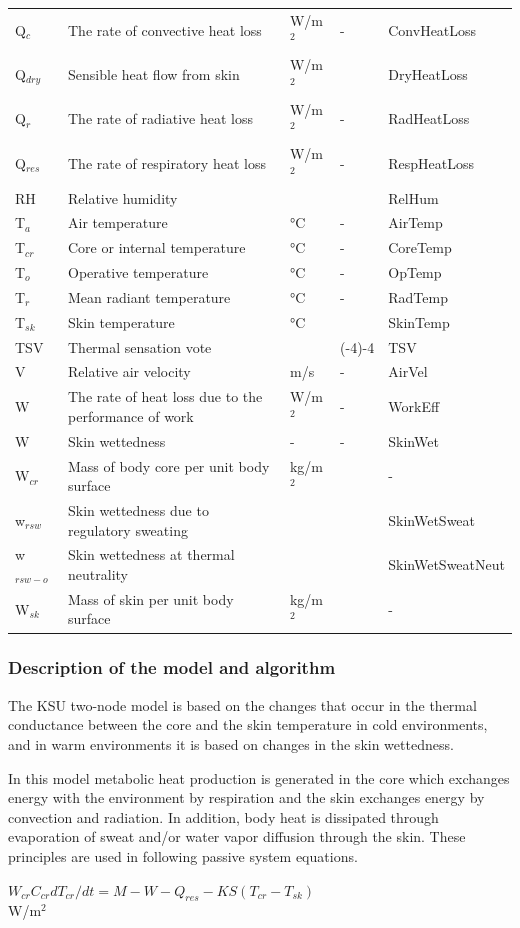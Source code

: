 \begin{longtable}[c]{p{1.2in}p{2.0in}p{0.8in}p{0.8in}p{1.2in}}
Q\(_{c}\) & The rate of convective heat loss & W/m\(^{2}\) & - & ConvHeatLoss \tabularnewline
Q\(_{dry}\) & Sensible heat flow from skin & W/m\(^{2}\) & ~ & DryHeatLoss \tabularnewline
Q\(_{r}\) & The rate of radiative heat loss & W/m\(^{2}\) & - & RadHeatLoss \tabularnewline
Q\(_{res}\) & The rate of respiratory heat loss & W/m\(^{2}\) & - & RespHeatLoss \tabularnewline
RH & Relative humidity & ~ & ~ & RelHum \tabularnewline
T\(_{a}\) & Air temperature & °C & - & AirTemp \tabularnewline
T\(_{cr}\) & Core or internal temperature & °C & - & CoreTemp \tabularnewline
T\(_{o}\) & Operative temperature & °C & - & OpTemp \tabularnewline
T\(_{r}\) & Mean radiant temperature & °C & - & RadTemp \tabularnewline
T\(_{sk}\) & Skin temperature & °C & ~ & SkinTemp \tabularnewline
TSV & Thermal sensation vote & ~ & (-4)-4 & TSV \tabularnewline
V & Relative air velocity & m/s & - & AirVel \tabularnewline
W & The rate of heat loss due to the performance of work & W/m\(^{2}\) & - & WorkEff \tabularnewline
W & Skin wettedness & - & - & SkinWet \tabularnewline
W\(_{cr}\) & Mass of body core per unit body surface & kg/m\(^{2}\) & ~ & - \tabularnewline
w\(_{rsw}\) & Skin wettedness due to regulatory sweating & ~ & ~ & SkinWetSweat \tabularnewline
w\(_{rsw-o}\) & Skin wettedness at thermal neutrality & ~ & ~ & SkinWetSweatNeut \tabularnewline
W\(_{sk}\) & Mass of skin per unit body surface & kg/m\(^{2}\) & ~ & - \tabularnewline
\bottomrule
\end{longtable}

\subsubsection{Description of the model and algorithm}\label{description-of-the-model-and-algorithm-2}

The KSU two-node model is based on the changes that occur in the thermal conductance between the core and the skin temperature in cold environments, and in warm environments it is based on changes in the skin wettedness.

In this model metabolic heat production is generated in the core which exchanges energy with the environment by respiration and the skin exchanges energy by convection and radiation. In addition, body heat is dissipated through evaporation of sweat and/or water vapor diffusion through the skin. These principles are used in following passive system equations.

\({W_{cr}}{C_{cr}}d{T_{cr}}/dt = M - W - {Q_{res}} - KS({T_{cr}} - {T_{sk}})\) ~~~~~~~~~~~~~~~~~~~~~~~~ W/m\(^{2}\)

